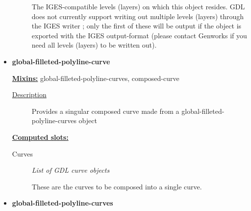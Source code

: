 \documentclass [11pt]{book}
\begin{document}
\begin{itemize}
\begin{description}
 The IGES-compatible levels (layers) on which this object resides. GDL does not currently support writing
out multiple levels (layers) through the IGES writer ; only the first of these will be output if the object is exported with
the IGES output-format (please contact Genworks if you need all levels (layers) to be written out).




\end{description}







\item {}
\label{prim:global-filleted-polyline-curve}
\textbf{global-filleted-polyline-curve}


\textbf{
\underline{Mixins:}} global-filleted-polyline-curves, composed-curve





\begin{description}

\item [
\underline{Description}]


Provides a singular composed curve made 
from a global-filleted-polyline-curves object



\end{description}








\textbf{
\underline{Computed slots:}}

\begin{description}

\item [Curves]
\emph{List of GDL curve objects}

 These are the curves to be composed into a single curve.




\end{description}







\item {}
\label{prim:global-filleted-polyline-curves}
\textbf{global-filleted-polyline-curves}



\end{itemize}
\end{document}
